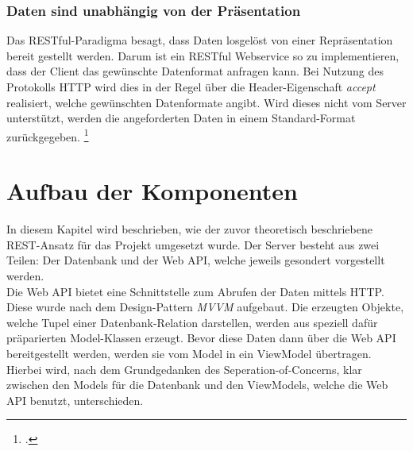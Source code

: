 \subsubsection*{Daten sind unabhängig von der Präsentation}
Das \ac{REST}ful-Paradigma besagt, dass Daten losgelöst von einer Repräsentation bereit gestellt werden. Darum ist ein \ac{REST}ful Webservice so zu implementieren, dass der Client das gewünschte Datenformat anfragen kann. Bei Nutzung des Protokolls HTTP wird dies in der Regel über die Header-Eigenschaft \textit{accept} realisiert, welche gewünschten Datenformate angibt. Wird dieses nicht vom Server unterstützt, werden die angeforderten Daten in einem Standard-Format zurückgegeben. \footcite[S. 26ff.]{REST-und-HTTP}
\section{Aufbau der Komponenten}
\label{sec:aufbau-Komponenten}
In diesem Kapitel wird beschrieben, wie der zuvor theoretisch beschriebene \ac{REST}-Ansatz für das Projekt umgesetzt wurde. Der Server besteht aus zwei Teilen: Der Datenbank und der Web \ac{API}, welche jeweils gesondert vorgestellt werden. \\
Die Web \ac{API} bietet eine Schnittstelle zum Abrufen der Daten mittels \ac{HTTP}. Diese wurde nach dem Design-Pattern \textit{\ac{MVVM}} aufgebaut. Die erzeugten Objekte, welche Tupel einer Datenbank-Relation darstellen, werden aus speziell dafür präparierten Model-Klassen erzeugt. Bevor diese Daten dann über die Web \ac{API} bereitgestellt werden, werden sie vom Model in ein ViewModel übertragen. Hierbei wird, nach dem Grundgedanken des \gls{Seperation-of-Concerns}, klar zwischen den Models für die Datenbank und den ViewModels, welche die Web \ac{API} benutzt, unterschieden.
